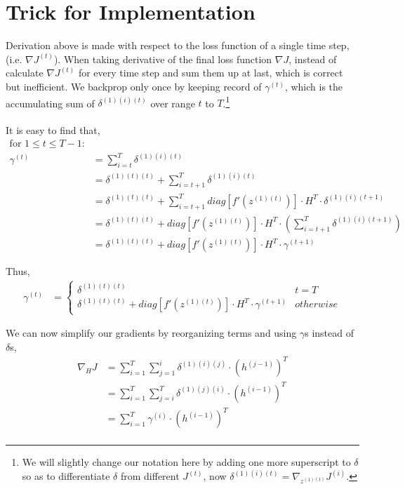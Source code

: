 \documentclass{article}
\begin{document}
	\section{Trick for Implementation}
	Derivation above is made with respect to the loss function of a single time step, (i.e. $\nabla J^{(t)}$). When taking derivative of the final loss function $\nabla J$, instead of calculate $\nabla J^{(t)}$ for every time step and sum them up at last, which is correct but inefficient. We backprop only once by keeping record of $\gamma^{(t)}$, which is the accumulating sum of $\delta^{(1)(i)(t)}$ over range $t$ to $T$.\footnote{We will slightly change our notation here by adding one more superscript to $\delta$ so as to differentiate $\delta$ from different $J^{(t)}$, now $\delta^{(1)(i)(t)} = \nabla_{z^{(1)(t)}}J^{(i)}$.} \\\\
	It is easy to find that,\\
	\begin{equation}
	\begin{aligned}
		\text{for $1 \le t \le T-1$:}\\
		\gamma^{(t)} &= \sum_{i=t}^{T} \delta^{(1)(i)(t)} \\
		&= \delta^{(1)(t)(t)} + \sum_{i=t+1}^{T} \delta^{(1)(i)(t)} \\
		&= \delta^{(1)(t)(t)} + \sum_{i=t+1}^{T} diag[f'(z^{(1)(t)})] \cdot H^T \cdot \delta^{(1)(i)(t+1)} \\
		&= \delta^{(1)(t)(t)} + diag[f'(z^{(1)(t)})] \cdot H^T \cdot \left(\sum_{i=t+1}^{T} \delta^{(1)(i)(t+1)}\right) \\		
		&= \delta^{(1)(t)(t)} + diag[f'(z^{(1)(t)})] \cdot H^T \cdot \gamma^{(t+1)} 
	\end{aligned}
	\end{equation}
	
	Thus,\\
	\begin{equation}
	\begin{aligned}
		\gamma^{(t)} &= 
		\begin{cases}
			\delta^{(1)(t)(t)} &t=T \\
			\delta^{(1)(t)(t)} + diag[f'(z^{(1)(t)})] \cdot H^T \cdot \gamma^{(t+1)} & otherwise
		\end{cases}
	\end{aligned}
	\end{equation}
	
	We can now simplify our gradients by reorganizing terms and using $\gamma$s instead of $\delta$s,
	\begin{equation}
	\begin{aligned}
		\nabla_{H} J &= \sum_{i=1}^{T} \sum_{j=1}^{i} \delta^{(1)(i)(j)} \cdot  (h^{(j-1)})^T\\
		&= \sum_{i=1}^{T} \sum_{j=i}^{T} \delta^{(1)(j)(i)} \cdot  (h^{(i-1)})^T\\
		&= \sum_{i=1}^{T} \gamma^{(i)} \cdot  (h^{(i-1)})^T\\
	\end{aligned}
	\end{equation}
	
\end{document}
